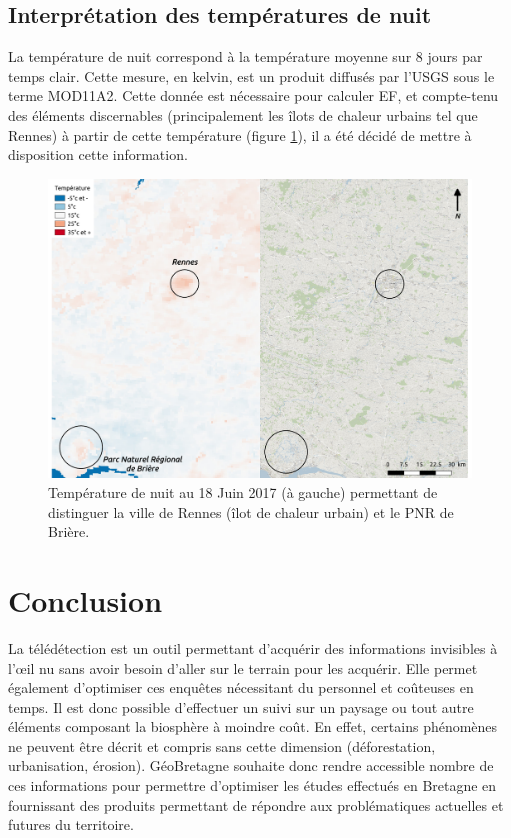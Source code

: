 \documentclass[10pt,a4paper]{article}
\begin{document}
\subsection{Interprétation des températures de nuit}

La température de nuit correspond à la température moyenne sur 8 jours par temps clair. Cette mesure, en kelvin, est un produit diffusés par l'USGS sous le terme MOD11A2. Cette donnée est nécessaire pour calculer EF, et compte-tenu des éléments discernables (principalement les îlots de chaleur urbains tel que Rennes) à partir de cette température (figure \ref{TN1}), il a été décidé de mettre à disposition cette information. \smallbreak 

\begin{figure}[!h]
\centering
\includegraphics[scale=0.33]{img/TN_interpretation1.pdf}
\caption{Température de nuit au 18 Juin 2017 (à gauche) permettant de distinguer la ville de Rennes (îlot de chaleur urbain) et le PNR de Brière.}
\label{TN1}
\end{figure}

\section{Conclusion}

La télédétection est un outil permettant d'acquérir des informations invisibles à l’œil nu sans avoir besoin d'aller sur le terrain pour les acquérir. Elle permet également d'optimiser ces enquêtes nécessitant du personnel et coûteuses en temps. Il est donc possible d'effectuer un suivi sur un paysage ou tout autre éléments composant la biosphère à moindre coût. En effet, certains phénomènes ne peuvent être décrit et compris sans cette dimension (déforestation, urbanisation, érosion).\smallbreak
GéoBretagne souhaite donc rendre accessible nombre de ces informations pour permettre d'optimiser les études effectués en Bretagne en fournissant des produits permettant de répondre aux problématiques actuelles et futures du territoire.\smallbreak
\end{document}
